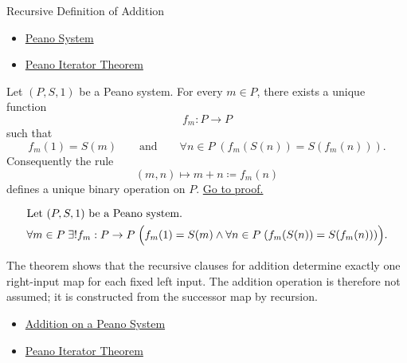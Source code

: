 \begin{topicbox}{Recursive Definition of Addition}
\begin{remark*}[Dependencies]
\begin{itemize}
  \item \hyperref[def:peano-system]{Peano System}
  \item \hyperref[thm:peano-iterator-theorem]{Peano Iterator Theorem}
\end{itemize}
\end{remark*}

\begin{tcolorbox}[colback=thmbox, colframe=thmborder, arc=2pt,
  left=6pt, right=6pt, top=4pt, bottom=4pt,
  title={\small\textbf{Theorem (Addition Is Well-Defined on a Peano System)}},
  fonttitle=\small\bfseries]
\begin{theorem}
\label{thm:addition-well-defined-on-peano-system}
Let $(P,S,1)$ be a Peano system. For every $m \in P$, there exists a unique
function
\[
f_m : P \to P
\]
such that
\[
f_m(1)=S(m)
\qquad\text{and}\qquad
\forall n \in P\;(f_m(S(n))=S(f_m(n))).
\]
Consequently the rule
\[
(m,n) \longmapsto m+n \coloneqq f_m(n)
\]
defines a unique binary operation on $P$.
\hyperref[prf-addition-well-defined-on-peano-system]{Go to proof.}
\end{theorem}
\end{tcolorbox}

\begin{remark*}
\[
\begin{aligned}
&\text{Let } (P,S,1) \text{ be a Peano system.}\\
&\forall m \in P\;\exists! f_m : P \to P\;
\Bigl(f_m(1)=S(m) \land
\forall n \in P\;(f_m(S(n))=S(f_m(n)))\Bigr).
\end{aligned}
\]
\end{remark*}

\begin{remark*}[Interpretation]
The theorem shows that the recursive clauses for addition determine exactly one
right-input map for each fixed left input. The addition operation is therefore
not assumed; it is constructed from the successor map by recursion.
\end{remark*}

\begin{remark*}[Dependencies]
\begin{itemize}
  \item \hyperref[def:addition-on-peano-system]{Addition on a Peano System}
  \item \hyperref[thm:peano-iterator-theorem]{Peano Iterator Theorem}
\end{itemize}
\end{remark*}
\end{topicbox}
